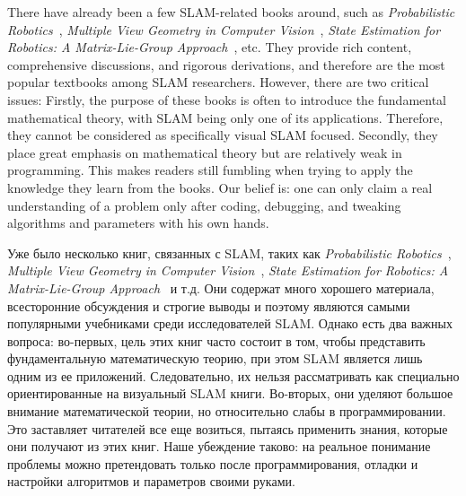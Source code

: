\begin{English}
    There have already been a few SLAM-related books around, such as \textit{Probabilistic Robotics}~\cite{Thrun2005}, \textit{Multiple View Geometry in Computer Vision}~\cite{Hartley2003}, \textit{State Estimation for Robotics: A Matrix-Lie-Group Approach}~\cite{Barfoot2016}, etc. They provide rich content, comprehensive discussions, and rigorous derivations, and therefore are the most popular textbooks among SLAM researchers. However,  there are two critical issues: Firstly, the purpose of these books is often to introduce the fundamental mathematical theory, with SLAM being only one of its applications. Therefore, they cannot be considered as specifically visual SLAM focused. Secondly, they place great emphasis on mathematical theory but are relatively weak in programming. This makes readers still fumbling when trying to apply the knowledge they learn from the books. Our belief is: one can only claim a real understanding of a problem only after coding, debugging, and tweaking algorithms and parameters with his own hands.
\end{English}

\begin{Russian}
    Уже было несколько книг, связанных с SLAM, таких как \textit{Probabilistic Robotics}~\cite{Thrun2005}, \textit{Multiple View Geometry in Computer Vision}~\cite{Hartley2003}, \textit{State Estimation for Robotics: A Matrix-Lie-Group Approach}~\cite{Barfoot2016} и т.д. Они содержат много хорошего материала, всесторонние обсуждения и строгие выводы и поэтому являются самыми популярными учебниками среди исследователей SLAM. Однако есть два важных вопроса: во-первых, цель этих книг часто состоит в том, чтобы представить фундаментальную математическую теорию, при этом SLAM является лишь одним из ее приложений. Следовательно, их нельзя рассматривать как специально ориентированные на визуальный SLAM книги. Во-вторых, они уделяют большое внимание математической теории, но относительно слабы в программировании. Это заставляет читателей все еще возиться, пытаясь применить знания, которые они получают из этих книг. Наше убеждение таково: на реальное понимание проблемы можно претендовать только после программирования, отладки и настройки алгоритмов и параметров своими руками.
\end{Russian}

